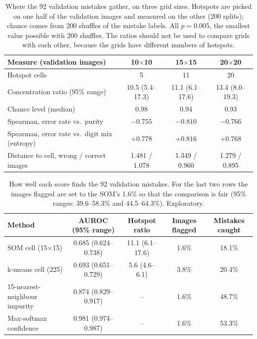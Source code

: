 \documentclass[11pt]{article}
\begin{document}
\begin{table}[H]
\centering
\renewcommand{\arraystretch}{1.12}
\small
\begin{tabular}{|l|c|c|c|}
\hline
\textbf{Measure (validation images)} & \textbf{10$\times$10} & \textbf{15$\times$15} & \textbf{20$\times$20} \\ \hline
Hotspot cells & 5 & 11 & 20 \\ \hline
Concentration ratio (95\% range) & 10.5 (5.4--17.3) & 11.1 (6.1--17.6) & 13.4 (8.0--19.3) \\ \hline
Chance level (median) & 0.98 & 0.94 & 0.93 \\ \hline
Spearman, error rate vs.\ purity & $-0.755$ & $-0.810$ & $-0.766$ \\ \hline
Spearman, error rate vs.\ digit mix (entropy) & $+0.778$ & $+0.816$ & $+0.768$ \\ \hline
Distance to cell, wrong / correct images & 1.481 / 1.078 & 1.349 / 0.960 & 1.279 / 0.895 \\ \hline
\end{tabular}
\caption{Where the 92 validation mistakes gather, on three grid sizes. Hotspots are picked on one half of the validation images and measured on the other (200 splits); chance comes from 200 shuffles of the mistake labels. All $p=0.005$, the smallest value possible with 200 shuffles. The ratios should not be used to compare grids with each other, because the grids have different numbers of hotspots.}
\label{tab:hotspots}
\end{table}

\begin{table}[H]
\centering
\renewcommand{\arraystretch}{1.12}
\footnotesize\setlength{\tabcolsep}{3pt}
\begin{tabular}{|l|c|c|c|c|}
\hline
\textbf{Method} & \textbf{AUROC (95\% range)} & \textbf{Hotspot ratio} & \textbf{Images flagged} & \textbf{Mistakes caught} \\ \hline
SOM cell (15$\times$15) & 0.685 (0.624--0.738) & 11.1 (6.1--17.6) & 1.6\% & 18.1\% \\ \hline
k-means cell (225) & 0.693 (0.651--0.729) & 5.6 (4.6--6.1) & 3.8\% & 20.4\% \\ \hline
15-nearest-neighbour impurity & 0.874 (0.829--0.917) & -- & 1.6\% & 48.7\% \\ \hline
Max-softmax confidence & 0.981 (0.974--0.987) & -- & 1.6\% & 53.3\% \\ \hline
\end{tabular}
\caption{How well each score finds the 92 validation mistakes. For the last two rows the images flagged are set to the SOM's 1.6\% so that the comparison is fair (95\% ranges: 39.6--58.3\% and 44.5--64.3\%). Exploratory.}
\label{tab:baselines}
\end{table}
\end{document}
